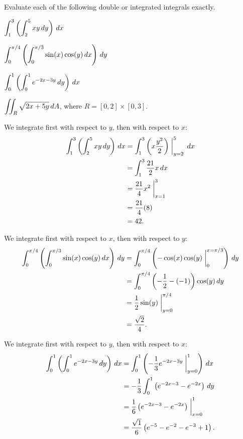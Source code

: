 \begin{exercises} 

\item Evaluate each of the following double or integrated integrals exactly.
\ba
	\item $\displaystyle \int_1^3 \left( \int_2^5 xy \, dy \right) \, dx$
	\item $\displaystyle \int_0^{\pi/4} \left( \int_0^{\pi/3} \sin(x) \cos(y) \, dx \right) \, dy$
	\item $\displaystyle \int_0^1 \left( \int_0^1 e^{-2x - 3y} \, dy \right) \, dx$
	\item $\displaystyle \iint_R \sqrt{2x + 5y} \, dA$, where $R = [0,2]\times[0,3]$.
\ea

\begin{exerciseSolution}
\ba
	\item We integrate first with respect to $y$, then with respect to $x$:
\begin{align*}
\int_1^3 \left( \int_2^5 xy \, dy \right) \, dx &= \int_1^3 \left( x\frac{y^2}{2}\right)\biggm|_{y=2}^{5} \, dx \\
	&= \int_1^3  \frac{21}{2}x \, dx  \\
	&= \frac{21}{4}x^2 \biggm|_{x=1}^3 \\
	&= \frac{21}{4}(8) \\
	&= 42.
\end{align*}

	\item We integrate first with respect to $x$, then with respect to $y$:
\begin{align*}
\int_0^{\pi/4} \left( \int_0^{\pi/3} \sin(x) \cos(y) \, dx \right) \, dy &= \int_0^{\pi/4} \left( -\cos(x) \cos(y) \biggm|_0^{x=\pi/3}  \right) \, dy  \\
	&= \int_0^{\pi/4} \left( -\frac{1}{2}-(-1)\right) \cos(y) \, dy  \\
	&= \frac{1}{2} \sin(y) \biggm|_{y=0}^{\pi/4} \\
	&= \frac{\sqrt{2}}{4}.
\end{align*}

	\item We integrate first with respect to $y$, then with respect to $x$:
\begin{align*}
\int_0^1 \left( \int_0^1 e^{-2x - 3y} \, dy \right) \, dx &= \int_0^1 \left( -\frac{1}{3}e^{-2x - 3y}\biggm|_{y=0}^1 \right) \, dx  \\
	&= -\frac{1}{3} \int_0^{1} \left( e^{-2x-3} - e^{-2x} \right) \, dy  \\
	&= \frac{1}{6} \left(e^{-2x-3} - e^{-2x}\right) \biggm|_{x=0}^{1} \\
	&= \frac{\sqrt{1}}{6} \left(e^{-5}-e^{-2} - e^{-3} + 1\right).
\end{align*}


\end{exerciseSolution}
\end{exercises}
